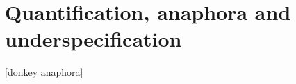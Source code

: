 \chapter{Quantification, anaphora and underspecification}
\label{ch:quant}
\setcounter{examplectr}{0}

[donkey anaphora]

